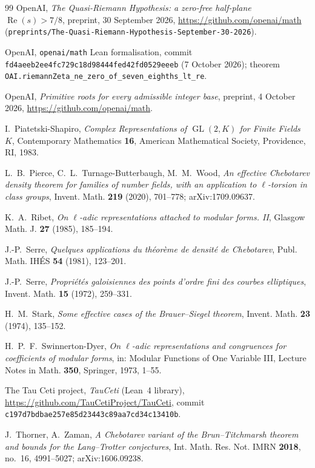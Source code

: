 \documentclass[11pt]{amsart}
\theoremstyle{definition}
\theoremstyle{remark}
\DeclareMathOperator{\GL}{GL}
\begin{document}
\begin{thebibliography}{99}
OpenAI, \emph{The Quasi-Riemann Hypothesis: a zero-free half-plane $\operatorname{Re}(s)>7/8$}, preprint,
30 September 2026, \url{https://github.com/openai/math}
(\texttt{preprints/The-Quasi-Riemann-Hypothesis-September-30-2026}).

OpenAI, \texttt{openai/math} Lean formalisation, commit \texttt{fd4aeeb2ee4fc729c18d98444fed42fd0529eeeb}
(7 October 2026); theorem \texttt{OAI.riemannZeta\_ne\_zero\_of\_seven\_eighths\_lt\_re}.

OpenAI, \emph{Primitive roots for every admissible integer base}, preprint, 4 October 2026,
\url{https://github.com/openai/math}.

I.~Piatetski-Shapiro, \emph{Complex Representations of $\GL(2,K)$ for Finite Fields $K$}, Contemporary Mathematics
\textbf{16}, American Mathematical Society, Providence, RI, 1983.

L.~B.~Pierce, C.~L.~Turnage-Butterbaugh, M.~M.~Wood, \emph{An effective Chebotarev density theorem for families of
number fields, with an application to $\ell$-torsion in class groups}, Invent. Math. \textbf{219} (2020), 701--778;
arXiv:1709.09637.

K.~A.~Ribet, \emph{On $\ell$-adic representations attached to modular forms. II}, Glasgow Math. J. \textbf{27} (1985),
185--194.

J.-P.~Serre, \emph{Quelques applications du th\'eor\`eme de densit\'e de Chebotarev}, Publ. Math. IH\'ES \textbf{54}
(1981), 123--201.

J.-P.~Serre, \emph{Propri\'et\'es galoisiennes des points d'ordre fini des courbes elliptiques}, Invent. Math.
\textbf{15} (1972), 259--331.

H.~M.~Stark, \emph{Some effective cases of the Brauer--Siegel theorem}, Invent. Math. \textbf{23} (1974), 135--152.

H.~P.~F.~Swinnerton-Dyer, \emph{On $\ell$-adic representations and congruences for coefficients of modular forms}, in:
Modular Functions of One Variable III, Lecture Notes in Math. \textbf{350}, Springer, 1973, 1--55.

The Tau Ceti project, \emph{TauCeti} (Lean~4 library), \url{https://github.com/TauCetiProject/TauCeti}, commit
\texttt{c197d7bdbae257e85d23443c89aa7cd34c13410b}.

J.~Thorner, A.~Zaman, \emph{A Chebotarev variant of the Brun--Titchmarsh theorem and bounds for the Lang--Trotter
conjectures}, Int. Math. Res. Not. IMRN \textbf{2018}, no.~16, 4991--5027; arXiv:1606.09238.


\end{thebibliography}
\end{document}
